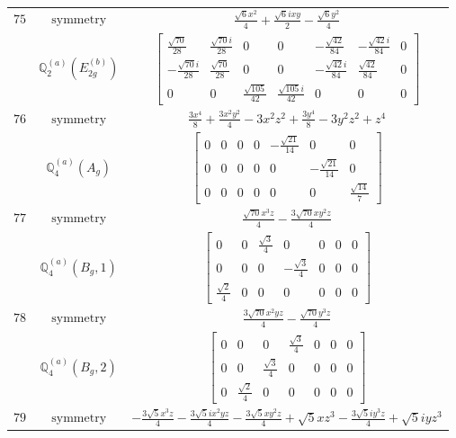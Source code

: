 \documentclass[fleqn,8pt,landscape]{jsarticle}
\begin{document}
\begin{longtable}{ccc}
$ 75 $ & $ \text{symmetry} $ & $ \frac{\sqrt{6} x^{2}}{4} + \frac{\sqrt{6} i x y}{2} - \frac{\sqrt{6} y^{2}}{4} $ \\
$  $ & $ \mathbb{Q}_{2}^{(a)}(E_{2g}^{(b)}) $ & $ \begin{bmatrix} \frac{\sqrt{70}}{28} & \frac{\sqrt{70} i}{28} & 0 & 0 & - \frac{\sqrt{42}}{84} & - \frac{\sqrt{42} i}{84} & 0 \\ - \frac{\sqrt{70} i}{28} & \frac{\sqrt{70}}{28} & 0 & 0 & - \frac{\sqrt{42} i}{84} & \frac{\sqrt{42}}{84} & 0 \\ 0 & 0 & \frac{\sqrt{105}}{42} & \frac{\sqrt{105} i}{42} & 0 & 0 & 0 \end{bmatrix} $ \\ \hline
$ 76 $ & $ \text{symmetry} $ & $ \frac{3 x^{4}}{8} + \frac{3 x^{2} y^{2}}{4} - 3 x^{2} z^{2} + \frac{3 y^{4}}{8} - 3 y^{2} z^{2} + z^{4} $ \\
$  $ & $ \mathbb{Q}_{4}^{(a)}(A_{g}) $ & $ \begin{bmatrix} 0 & 0 & 0 & 0 & - \frac{\sqrt{21}}{14} & 0 & 0 \\ 0 & 0 & 0 & 0 & 0 & - \frac{\sqrt{21}}{14} & 0 \\ 0 & 0 & 0 & 0 & 0 & 0 & \frac{\sqrt{14}}{7} \end{bmatrix} $ \\ \hline
$ 77 $ & $ \text{symmetry} $ & $ \frac{\sqrt{70} x^{3} z}{4} - \frac{3 \sqrt{70} x y^{2} z}{4} $ \\
$  $ & $ \mathbb{Q}_{4}^{(a)}(B_{g},1) $ & $ \begin{bmatrix} 0 & 0 & \frac{\sqrt{3}}{4} & 0 & 0 & 0 & 0 \\ 0 & 0 & 0 & - \frac{\sqrt{3}}{4} & 0 & 0 & 0 \\ \frac{\sqrt{2}}{4} & 0 & 0 & 0 & 0 & 0 & 0 \end{bmatrix} $ \\ \hline
$ 78 $ & $ \text{symmetry} $ & $ \frac{3 \sqrt{70} x^{2} y z}{4} - \frac{\sqrt{70} y^{3} z}{4} $ \\
$  $ & $ \mathbb{Q}_{4}^{(a)}(B_{g},2) $ & $ \begin{bmatrix} 0 & 0 & 0 & \frac{\sqrt{3}}{4} & 0 & 0 & 0 \\ 0 & 0 & \frac{\sqrt{3}}{4} & 0 & 0 & 0 & 0 \\ 0 & \frac{\sqrt{2}}{4} & 0 & 0 & 0 & 0 & 0 \end{bmatrix} $ \\ \hline
$ 79 $ & $ \text{symmetry} $ & $ - \frac{3 \sqrt{5} x^{3} z}{4} - \frac{3 \sqrt{5} i x^{2} y z}{4} - \frac{3 \sqrt{5} x y^{2} z}{4} + \sqrt{5} x z^{3} - \frac{3 \sqrt{5} i y^{3} z}{4} + \sqrt{5} i y z^{3} $ \\

\end{longtable}
\end{document}
